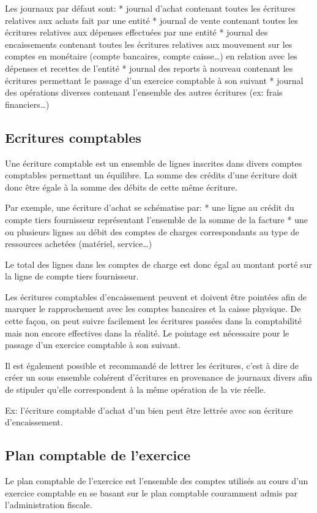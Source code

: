 \documentclass[a4paper,10pt,oneside,french]{sphinxmanual}
\begin{document}
Les journaux par défaut sont:
* journal d’achat contenant toutes les écritures relatives aux achats fait par une entité
* journal de vente contenant toutes les écritures relatives aux dépenses effectuées par une entité
* journal des encaissements contenant toutes les écritures relatives aux mouvement sur les comptes en monétaire (compte bancaires, compte caisse…) en relation avec les dépenses et recettes de l’entité
* journal des reports à nouveau contenant les écritures permettant le passage d’un exercice comptable à son suivant
* journal des opérations diverses contenant l’ensemble des autres écritures (ex: frais financiers…)


\subsection{Ecritures comptables}
\label{\detokenize{accounting/definition:ecritures-comptables}}
Une écriture comptable est un ensemble de lignes inscrites dans divers
comptes comptables permettant un équilibre.
La somme des crédits d’une écriture doit donc être égale à la somme des débits de cette même écriture.

Par exemple, une écriture d’achat se schématise par:
* une ligne au crédit du compte tiers fournisseur représentant l’ensemble de la somme de la facture
* une ou plusieurs lignes au débit des comptes de charges correspondants au type de ressources achetées (matériel, service…)

Le total des lignes dans les comptes de charge est donc égal au montant
porté sur la ligne de compte tiers fournisseur.

Les écritures comptables d’encaissement peuvent et doivent être pointées afin de marquer le rapprochement avec les comptes bancaires et
la caisse physique. De cette façon, on peut suivre facilement les écritures passées dans la comptabilité mais non encore effectives dans
la réalité. Le pointage est nécessaire pour le passage d’un exercice comptable à son suivant.

Il est également possible et recommandé de lettrer les écritures, c’est à dire de créer un sous ensemble
cohérent d’écritures en provenance de journaux divers afin de stipuler qu’elle correspondent à la même opération de la vie réelle.

Ex: l’écriture comptable d’achat d’un bien peut être lettrée avec son écriture d’encaissement.


\subsection{Plan comptable de l’exercice}
\label{\detokenize{accounting/definition:plan-comptable-de-l-exercice}}
Le plan comptable de l’exercice est l’ensemble des comptes utilisés au
cours d’un exercice comptable en se basant sur le plan comptable
couramment admis par l’administration fiscale.
\end{document}
